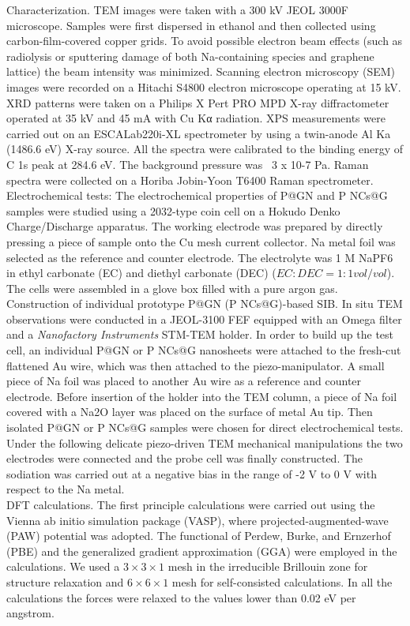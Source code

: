 Characterization. TEM images were taken with a 300 kV JEOL 3000F microscope. Samples were first dispersed in ethanol and then collected using carbon-film-covered copper grids. To avoid possible electron beam effects (such as radiolysis or sputtering damage of both Na-containing species and graphene lattice) the beam intensity was minimized. Scanning electron microscopy (SEM) images were recorded on a Hitachi S4800 electron microscope operating at 15 kV. XRD patterns were taken on a Philips X Pert PRO MPD X-ray diffractometer operated at 35 kV and 45 mA with Cu Kα radiation. XPS measurements were carried out on an ESCALab220i-XL spectrometer by using a twin-anode Al Ka (1486.6 eV) X-ray source. All the spectra were calibrated to the binding energy of C 1s peak at 284.6 eV. The background pressure was ~3 x 10-7 Pa. Raman spectra were collected on a Horiba Jobin-Yoon T6400 Raman spectrometer.\\
Electrochemical tests: The electrochemical properties of P@GN and P NCs@G samples were studied using a 2032-type coin cell on a Hokudo Denko Charge/Discharge apparatus. The working electrode was prepared by directly pressing a piece of sample onto the Cu mesh current collector. Na metal foil was selected as the reference and counter electrode. The electrolyte was 1 M NaPF6 in ethyl carbonate (EC) and diethyl carbonate (DEC) ($EC : DEC = 1 : 1 vol/vol$). The cells were assembled in a glove box filled with a pure argon gas.\\ 
Construction of individual prototype P@GN (P NCs@G)-based SIB. In situ TEM observations were conducted in a JEOL-3100 FEF equipped with an Omega filter and a {\em Nanofactory Instruments} STM-TEM holder. In order to build up the test cell, an individual P@GN or P NCs@G nanosheets were attached to the fresh-cut flattened Au wire, which was then attached to the piezo-manipulator. A small piece of Na foil was placed to another Au wire as a reference and counter electrode. Before insertion of the holder into the TEM column, a piece of Na foil covered with a Na2O layer was placed on the surface of metal Au tip. Then isolated P@GN or P NCs@G samples were chosen for direct electrochemical tests. Under the following delicate piezo-driven TEM mechanical manipulations the two electrodes were connected and the probe cell was finally constructed. The sodiation was carried out at a negative bias in the range of -2 V to 0 V with respect to the Na metal.\\
DFT calculations. The first principle calculations were carried out using the Vienna ab initio simulation package (VASP),\cite{Kresse1996} where projected-augmented-wave (PAW) potential was adopted.\cite{Kresse1999} The functional of Perdew, Burke, and Ernzerhof (PBE) and the generalized gradient approximation (GGA)\cite{Perdew1996} were employed in the calculations. We used a $3\times3\times1$ mesh in the irreducible Brillouin zone for structure relaxation and $6\times6\times1$ mesh for self-consisted calculations. In all the calculations the forces were relaxed to the values lower than 0.02 eV per angstrom.

